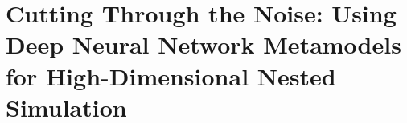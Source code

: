 \documentclass[9pt,handout]{beamer}
\begin{document}
\section[Using DNNs for Nested Simulation]{Cutting Through the Noise: Using Deep Neural Network Metamodels for High-Dimensional Nested Simulation}








\end{document}
